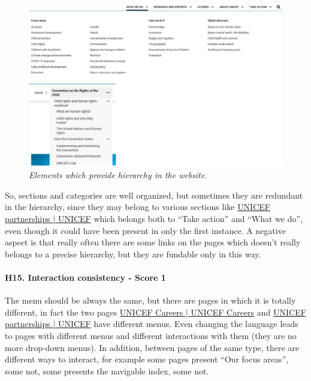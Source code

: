 \begin{figure}[!h]
	\begin{center}
		\includegraphics[width=\textwidth]{FinalScores18.jpg}
		\captionsetup{font=small}
		\caption{\textit{Elements which provide hierarchy in the website.}}
	\end{center}
\end{figure}
\newline
So, sections and categories are well organized, but sometimes they are redundant in the hierarchy, since they may belong to various sections like \href{https://www.unicef.org/partnerships}{UNICEF partnerships | UNICEF} which belongs both to “Take action” and “What we do”, even though it could have been present in only the first instance. 
\newline A negative aspect is that really often there are some links on the pages which doesn’t really belongs to a precise hierarchy, but they are fundable only in this way.
\newline
\newline \paragraph{H15. Interaction consistency - Score 1}	The menu should be always the same, but there are pages in which it is totally different, in fact the two pages \href{https://www.unicef.org/careers/}{UNICEF Careers | UNICEF Careers} and \href{https://www.unicef.org/partnerships}{UNICEF partnerships | UNICEF} have different menus. Even changing the language leads to pages with different menus and different interactions with them (they are no more drop-down menus).
\newline In addition, between pages of the same type, there are different ways to interact, for example  some pages present “Our focus areas”, some not, some presents the navigable index, some not.
